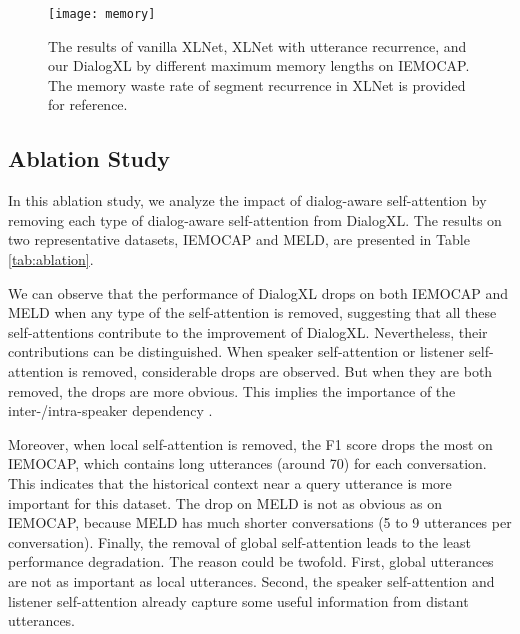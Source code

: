 \documentclass[letterpaper]{article} \usepackage{aaai21}  \usepackage{times}  \usepackage{helvet} \usepackage{courier}  \usepackage[hyphens]{url}  \usepackage{graphicx} \usepackage{amstext}
\begin{document}
\begin{figure}[t]
	\centering
	\texttt{[image: memory]} \caption{The results of vanilla XLNet, XLNet with utterance recurrence, and our DialogXL by different maximum memory lengths on IEMOCAP. The memory waste rate of segment recurrence in XLNet  is provided for reference.}
	\label{fig:memory}
\end{figure}



\subsection{Ablation Study}
In this ablation study, we analyze the impact of dialog-aware self-attention by removing each type of dialog-aware self-attention from DialogXL. The results on two representative datasets, IEMOCAP and MELD, are presented in Table \ref{tab:ablation}. 

We can observe that the performance of DialogXL drops on both IEMOCAP and MELD when any type of the self-attention is removed, suggesting that all these self-attentions contribute to the improvement of DialogXL. Nevertheless, their contributions can be distinguished. When speaker self-attention or listener self-attention is removed, considerable drops are observed. But when they are both removed, the drops are more obvious. This implies the importance of the inter-/intra-speaker dependency \cite{ghosal2019dialoguegcn}. 

Moreover, when local self-attention is removed, the F1 score drops the most on IEMOCAP, which contains long utterances (around 70) for each conversation. This indicates that the historical context near a query utterance is more important for this dataset. The drop on MELD is not as obvious as on IEMOCAP, because MELD has much shorter conversations (5 to 9 utterances per conversation). Finally, the removal of global self-attention leads to the least performance degradation. The reason could be twofold. First, global utterances are not as important as local utterances. Second, the speaker self-attention and listener self-attention already capture some useful information from distant utterances.
\end{document}
